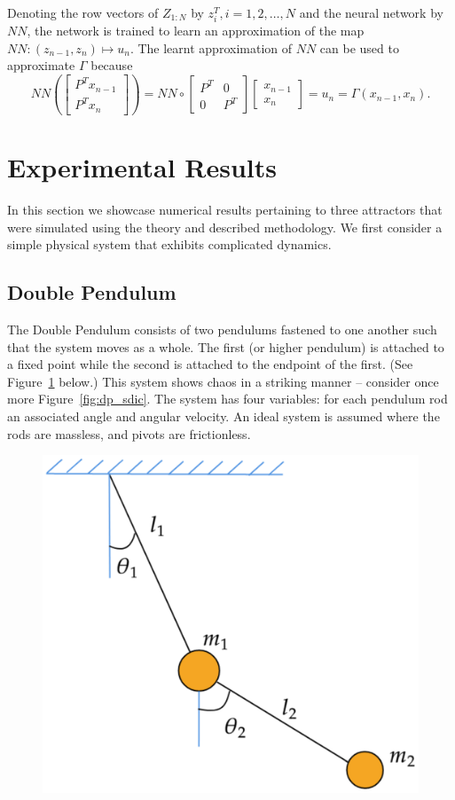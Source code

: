 Denoting the row vectors of $Z_{1:N}$ by  $z_i^T, i=1,2,\ldots,N$ and the neural network by $NN$, the network is trained to learn an approximation of the map
$NN: (z_{n-1},z_n) \mapsto  u_n.
$
The learnt approximation of $NN$ can be used to approximate $\Gamma$ because 
\begin{equation}\label{Seq_RNN}
  NN\left( \begin{bmatrix} 
    P^Tx_{n-1} \\
    P^Tx_n
    \end{bmatrix}
    \right) = NN \circ 
    \begin{bmatrix}
    P^T & 0 \\
    0 & P^T 
    \end{bmatrix}\begin{bmatrix}
    x_{n-1}\\
    x_n
    \end{bmatrix} = u_n = \Gamma(x_{n-1},x_n).
\end{equation}


\section{Experimental Results}
In this section we showcase numerical results pertaining to three attractors that were simulated using the theory and described methodology. We first consider a simple physical system that exhibits complicated dynamics.
\subsection{Double Pendulum}

The Double Pendulum consists of two pendulums fastened to one another such that the system moves as a whole. The first (or higher pendulum) is attached to a fixed point while the second is attached to the endpoint of the first. (See Figure~\ref{fig:dp_setup} below.)
This system shows chaos in a striking manner -- consider once more Figure~\ref{fig:dp_sdic}.
The system has four variables: for each pendulum rod an associated angle and angular velocity. An ideal system is assumed where the rods are massless, and pivots are frictionless.
\begin{figure}[ht]
  \includegraphics[width=0.4\linewidth]{Graphs/_dp_setup.eps}
  \centering
\label{fig:dp_setup}
\end{figure}

